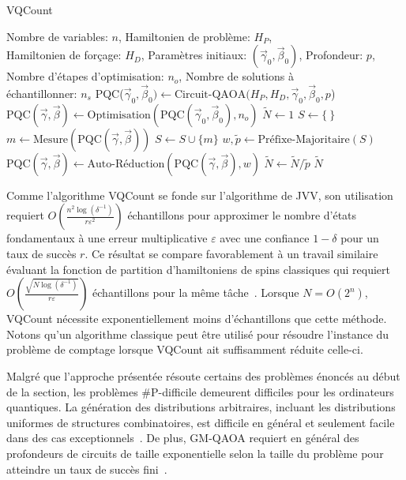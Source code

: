 \begin{algorithm}[h]
    \caption{VQCount}\label{alg:vqcount}
    \begin{algorithmic}[1]
    \REQUIRE Nombre de variables: $n$, Hamiltonien de problème: $H_P$,\\Hamiltonien de forçage: $H_D$, Paramètres initiaux: $(\vec{\gamma}_0, \vec{\beta}_0)$, Profondeur: $p$, Nombre d'étapes d'optimisation: $n_{o}$, Nombre de solutions à\\échantillonner: $n_s$
    \STATE PQC($\vec{\gamma}_0, \vec{\beta}_0) \leftarrow \text{Circuit-QAOA}(H_P, H_D, \vec{\gamma}_0, \vec{\beta}_0, p$)
    \STATE $\text{PQC}(\vec{\gamma}, \vec{\beta}) \leftarrow \text{Optimisation}(\text{PQC}(\vec{\gamma}_0, \vec{\beta}_0), n_{o})$
    \STATE $\tilde{N} \leftarrow 1$
    \STATE $S \leftarrow \{ \ \}$
    \STATE $m \leftarrow \text{Mesure}(\text{PQC}(\vec{\gamma}, \vec{\beta}))$
    \STATE $S \leftarrow S \cup \{m\}$
    \ENDIF
    \ENDWHILE
    \STATE $w, \tilde{p} \leftarrow \text{Préfixe-Majoritaire}(S)$
    \STATE $\text{PQC}(\vec{\gamma}, \vec{\beta}) \leftarrow \text{Auto-Réduction}(\text{PQC}(\vec{\gamma}, \vec{\beta}), w)$
    \STATE $\tilde{N} \leftarrow \tilde{N} / \tilde{p}$
    \ENDFOR
    \RETURN $\tilde{N}$
\end{algorithmic}
\end{algorithm}
    
Comme l'algorithme VQCount se fonde sur l'algorithme de JVV, son utilisation requiert $O(\frac{n^{2} \log (\delta^{-1})}{r \varepsilon^{2}})$ échantillons pour approximer le nombre d'états fondamentaux à une erreur multiplicative $\varepsilon$ avec une confiance $1 - \delta$ pour un taux de succès $r$. Ce résultat se compare favorablement à un travail similaire évaluant la fonction de partition d'hamiltoniens de spins classiques qui requiert $O(\frac{\sqrt{N \log(\delta^{-1})}}{r \varepsilon})$ échantillons pour la même tâche~\cite{sundarQuantumAlgorithmCount2019}. Lorsque $N=O(2^{n})$, VQCount nécessite exponentiellement moins d'échantillons que cette méthode. Notons qu'un algorithme classique peut être utilisé pour résoudre l'instance du problème de comptage lorsque VQCount ait suffisamment réduite celle-ci.

Malgré que l'approche présentée résoute certains des problèmes énoncés au début de la section, les problèmes \textsf{\#P}-difficile demeurent difficiles pour les ordinateurs quantiques. La génération des distributions arbitraires, incluant les distributions uniformes de structures combinatoires, est difficile en général et seulement facile dans des cas exceptionnels~\cite{aaronsonComputationalComplexityLinear2011, boulandComplexityVerificationQuantum2019}. De plus, GM-QAOA requiert en général des profondeurs de circuits de taille exponentielle selon la taille du problème pour atteindre un taux de succès fini~\cite{xiePerformanceUpperBound2025}. 

